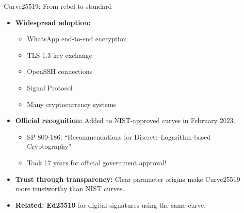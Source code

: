 \documentclass[aspectratio=169, lualatex, handout]{beamer}
\begin{document}
\begin{frame}{Curve25519: From rebel to standard}
	\begin{itemize}
		\item \textbf{Widespread adoption:}
		      \begin{itemize}
			      \item WhatsApp end-to-end encryption
			      \item TLS 1.3 key exchange
			      \item OpenSSH connections
			      \item Signal Protocol
			      \item Many cryptocurrency systems
		      \end{itemize}
		\item \textbf{Official recognition:} Added to NIST-approved curves in February 2023.
		      \begin{itemize}
			      \item SP 800-186: ``Recommendations for Discrete Logarithm-based Cryptography''
			      \item Took 17 years for official government approval!
		      \end{itemize}
		\item \textbf{Trust through transparency:} Clear parameter origins make Curve25519 more trustworthy than NIST curves.
		\item \textbf{Related: Ed25519} for digital signatures using the same curve.
	\end{itemize}
\end{frame}
\end{document}
